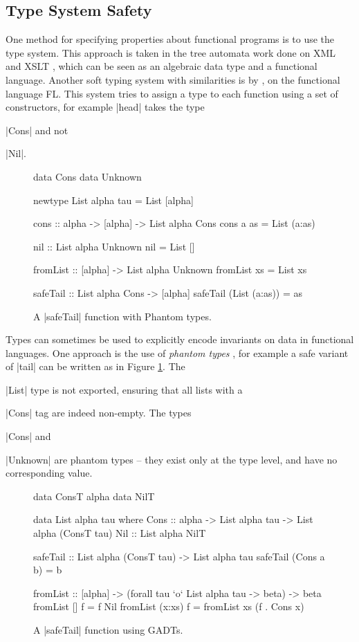 \subsection{Type System Safety}

One method for specifying properties about functional programs is to use the type system. This approach is taken in the tree automata work done on XML and XSLT \cite{static_xslt}, which can be seen as an algebraic data type and a functional language. Another soft typing system with similarities is by \citet{aiken:type_infer}, on the functional language FL. This system tries to assign a type to each function using a set of constructors, for example |head| takes the type \ignore|Cons| and not \ignore|Nil|.

\begin{figure}
\begin{code}
data Cons
data Unknown

newtype List alpha tau = List [alpha]

cons :: alpha -> [alpha] -> List alpha Cons
cons a as = List (a:as)

nil :: List alpha Unknown
nil = List []

fromList :: [alpha] -> List alpha Unknown
fromList xs = List xs

safeTail :: List alpha Cons -> [alpha]
safeTail (List (a:as)) = as
\end{code}
\caption{A |safeTail| function with Phantom types.}
\label{figC:phantom}
\end{figure}

Types can sometimes be used to explicitly encode invariants on data in functional languages. One approach is the use of \textit{phantom types} \cite{fluet:phantom}, for example a safe variant of |tail| can be written as in Figure \ref{figC:phantom}. The \ignore|List| type is not exported, ensuring that all lists with a \ignore|Cons| tag are indeed non-empty. The types \ignore|Cons| and \ignore|Unknown| are phantom types -- they exist only at the type level, and have no corresponding value.

\begin{figure}
\ignore\begin{code}
data ConsT alpha
data NilT

data List alpha tau where
    Cons  :: alpha -> List alpha tau -> List alpha (ConsT tau)
    Nil   :: List alpha NilT

safeTail :: List alpha (ConsT tau) -> List alpha tau
safeTail (Cons a b) = b

fromList :: [alpha] -> (forall tau `o` List alpha tau -> beta) -> beta
fromList []      f = f Nil
fromList (x:xs)  f = fromList xs (f . Cons x)
\end{code}
\caption{A |safeTail| function using GADTs.}
\label{figC:gadt}
\end{figure}

